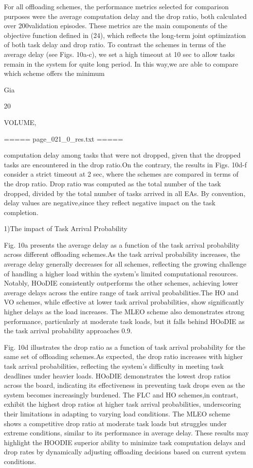 \documentclass{article}
\begin{document}
For all offloading schemes, the performance metrics selected for comparison purposes were the average computation delay and the drop ratio, both calculated over 200validation episodes. These metrics are the main components of the objective function defined in (24), which reflects the long-term joint optimization of both task delay and drop ratio. To contrast the schemes in terms of the average delay (see Figs. 10a-c), we set a high timeout at 10 sec to allow tasks remain in the system for quite long period. In this way,we are able to compare which scheme offers the minimum

Gia

20

VOLUME,

===== page\_021\_0\_res.txt =====


computation delay among tasks that were not dropped, given that the dropped tasks are encountered in the drop ratio.On the contrary, the results in Figs. 10d-f consider a strict timeout at 2 sec, where the schemes are compared in terms of the drop ratio. Drop ratio was computed as the total number of the task dropped, divided by the total number of tasks arrived in all EAs. By convention, delay values are negative,since they reflect negative impact on the task completion.

1)The impact of Task Arrival Probability

Fig. 10a presents the average delay as a function of the task arrival probability across different offloading schemes.As the task arrival probability increases, the average delay generally decreases for all schemes, reflecting the growing challenge of handling a higher load within the system's limited computational resources. Notably, HOoDIE consistently outperforms the other schemes, achieving lower average delays across the entire range of task arrival probabilities.The HO and VO schemes, while effective at lower task arrival probabilities, show significantly higher delays as the load increases. The MLEO scheme also demonstrates strong performance, particularly at moderate task loads, but it falls behind HOoDIE as the task arrival probability approaches 0.9.

Fig. 10d illustrates the drop ratio as a function of task arrival probability for the same set of offloading schemes.As expected, the drop ratio increases with higher task arrival probabilities, reflecting the system's difficulty in meeting task deadlines under heavier loads. HOoDIE demonstrates the lowest drop ratios across the board, indicating its effectiveness in preventing task drops even as the system becomes increasingly burdened. The FLC and HO schemes,in contrast, exhibit the highest drop ratios at higher task arrival probabilities, underscoring their limitations in adapting to varying load conditions. The MLEO scheme shows a competitive drop ratio at moderate task loads but struggles under extreme conditions, similar to its performance in average delay. These results may highlight the HOODIE superior ability to minimize task computation delays and drop rates by dynamically adjusting offloading decisions based on current system conditions.
\end{document}
